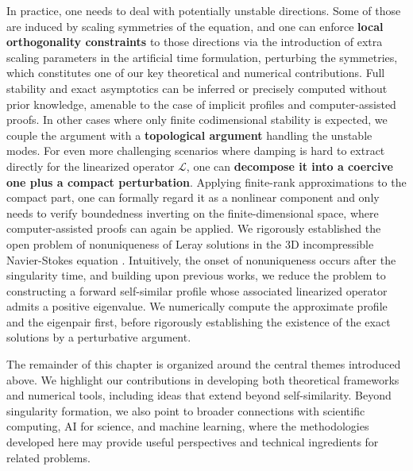 \documentclass[12pt]{caltech_thesis}
\numberwithin{equation}{section}
\begin{document}
In practice, one needs to deal with potentially unstable directions. Some of those are induced by scaling symmetries of the equation, and one can enforce \textbf{local orthogonality constraints} to those directions via the introduction of extra scaling parameters in the artificial time formulation, perturbing the symmetries, which constitutes one of our key theoretical and numerical contributions. Full stability and exact asymptotics can be inferred or precisely computed without prior knowledge, amenable to the case of implicit profiles and computer-assisted proofs. In other cases where only finite codimensional stability is expected, we couple the argument with a \textbf{topological argument} handling the unstable modes. For even more challenging scenarios where damping is hard to extract directly for the linearized operator $\mathcal{L}$, one can \textbf{decompose it into a coercive one plus a compact perturbation}. Applying finite-rank approximations to the compact part, one can formally regard it as a nonlinear component and only needs to verify boundedness inverting on the finite-dimensional space, where computer-assisted proofs can again be applied. We rigorously established the open problem of nonuniqueness of Leray solutions in the 3D incompressible Navier-Stokes equation \cite{hou2025nonuniqueness}. Intuitively, the onset of nonuniqueness occurs after the singularity time, and building upon previous works, we reduce the problem to constructing a forward self-similar profile whose associated linearized operator admits a positive eigenvalue. We numerically compute the approximate profile and the eigenpair first, before rigorously establishing the existence of the exact solutions by a perturbative argument.  

The remainder of this chapter is organized around the central themes introduced above. We highlight our contributions in developing both theoretical frameworks and numerical tools, including ideas that extend beyond self-similarity. Beyond singularity formation, we also point to broader connections with scientific computing, AI for science, and machine learning, where the methodologies developed here may provide useful perspectives and technical ingredients for related problems.
\end{document}
